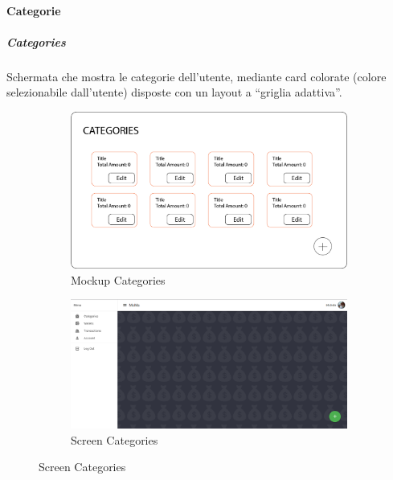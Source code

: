 \documentclass{report}
\begin{document}
\paragraph{Categorie}
\subparagraph{Categories}
Schermata che mostra le categorie dell’utente, mediante card colorate (colore selezionabile dall’utente) disposte con un layout a “griglia adattiva”.
\begin{figure}[H]
    \begin{subfigure}
        \centering
        \includegraphics[scale=0.3]{images/mockups/Categories.png}
        \caption{Mockup Categories}
    \end{subfigure}
    \par\bigskip
    \begin{subfigure}
        \centering
        \includegraphics[scale=0.35]{images/screens/Application.png}
        \caption{Screen Categories}
    \end{subfigure}
\end{figure}
\end{document}

